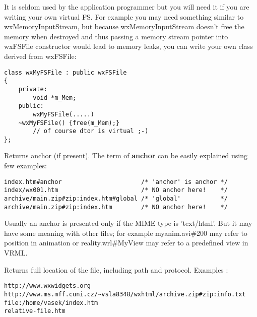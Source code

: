 
It is seldom used by the application programmer but you will need it if
you are writing your own virtual FS. For example you may need something
similar to wxMemoryInputStream, but because wxMemoryInputStream
doesn't free the memory when destroyed and thus passing a memory stream
pointer into wxFSFile constructor would lead to memory leaks, you
can write your own class derived from wxFSFile:

\begin{verbatim}
class wxMyFSFile : public wxFSFile
{
    private:
        void *m_Mem;
    public:
        wxMyFSFile(.....)
	~wxMyFSFile() {free(m_Mem);}
	    // of course dtor is virtual ;-)
};
\end{verbatim}

\label{wxfsfilegetanchor}


Returns anchor (if present). The term of {\bf anchor} can be easily
explained using few examples:

\begin{verbatim}
index.htm#anchor                      /* 'anchor' is anchor */
index/wx001.htm                       /* NO anchor here!    */
archive/main.zip#zip:index.htm#global /* 'global'           */
archive/main.zip#zip:index.htm        /* NO anchor here!    */
\end{verbatim}

Usually an anchor is presented only if the MIME type is 'text/html'.
But it may have some meaning with other files;
for example myanim.avi\#200 may refer to position in animation
or reality.wrl\#MyView may refer to a predefined view in VRML.

\label{wxfsfilegetlocation}


Returns full location of the file, including path and protocol. 
Examples : 

\begin{verbatim}
http://www.wxwidgets.org
http://www.ms.mff.cuni.cz/~vsla8348/wxhtml/archive.zip#zip:info.txt
file:/home/vasek/index.htm
relative-file.htm
\end{verbatim}

\label{wxfsfilegetmimetype}


